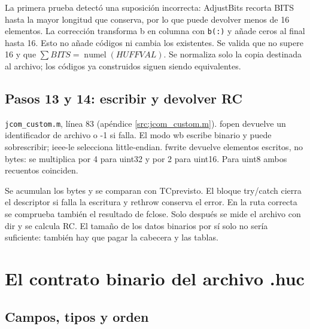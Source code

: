 \documentclass[11pt,a4paper,oneside]{report}
\begin{document}
La primera prueba detectó una suposición incorrecta: AdjustBits recorta BITS
hasta la mayor longitud que conserva, por lo que puede devolver menos de
16 elementos. La corrección transforma b en columna con \texttt{b(:)} y añade
ceros al final hasta 16. Esto no añade códigos ni cambia los existentes.
Se valida que no supere 16 y que $\sum BITS=\operatorname{numel}(HUFFVAL)$.
Se normaliza solo la copia destinada al archivo; los códigos ya construidos
siguen siendo equivalentes.


\section{Pasos 13 y 14: escribir y devolver RC}
\texttt{jcom\_custom.m}, línea 83 (apéndice \ref{src:jcom_custom.m}).
fopen devuelve un identificador de archivo o -1 si falla. El modo wb escribe
binario y puede sobrescribir; ieee-le selecciona little-endian. fwrite devuelve
elementos escritos, no bytes: se multiplica por 4 para uint32 y por 2 para uint16.
Para uint8 ambos recuentos coinciden.

Se acumulan los bytes y se comparan con TCprevisto. El bloque try/catch
cierra el descriptor si falla la escritura y rethrow conserva el error.
En la ruta correcta se comprueba también el resultado de fclose. Solo después
se mide el archivo con dir y se calcula RC. El tamaño de los datos binarios
por sí solo no sería suficiente: también hay que pagar la cabecera y las tablas.


\chapter{El contrato binario del archivo .huc}
\section{Campos, tipos y orden}
\end{document}
